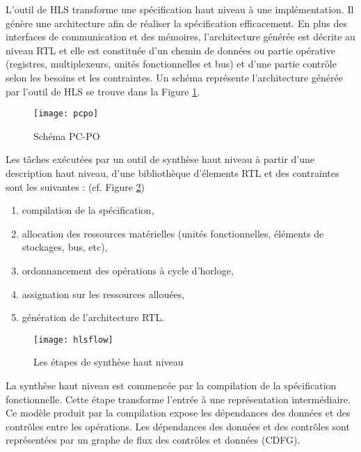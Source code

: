L'outil de HLS transforme une spécification haut niveau à une implémentation. Il génère une architecture
afin de réaliser la spécification efficacement. En plus des interfaces de communication et des mémoires,
l'architecture générée est décrite au niveau RTL et elle est constituée d'un chemin de données ou partie opérative (registres, multiplexeurs,
unités fonctionnelles et bus) et d'une partie contrôle selon les besoins et les contraintes. Un schéma représente
l'architecture générée par l'outil de HLS se trouve dans la Figure \ref{fig:pcpo}.

\begin{figure}[h]
	\centering
	\texttt{[image: pcpo]}
	\caption{Schéma PC-PO}
	\label{fig:pcpo}
	\vspace{-2mm}
\end{figure}

Les tâches exécutées par un outil de synthèse haut niveau à partir d'une description haut niveau,
d'une bibliothèque d'élements RTL et des contraintes sont les suivantes :
(cf. Figure \ref{fig:hlsflow})

\begin{enumerate}
	\item
	
	compilation de la spécification,
	\item
	
	allocation des ressources matérielles (unités fonctionnelles, éléments de stockages, bus, etc),
	\item
	
	ordonnancement des opérations à cycle d'horloge,
	\item
	
	assignation sur les ressources allouées,
	 \item
	
	génération de l'architecture RTL.
\end{enumerate}

\begin{figure}[h]
	\centering
	\texttt{[image: hlsflow]}
	\caption{Les étapes de synthèse haut niveau\cite{Coussy2009}}
	\label{fig:hlsflow}
	\vspace{-2mm}
\end{figure}

La synthèse haut niveau est commencée par la compilation de la spécification fonctionnelle.
Cette étape transforme l'entrée à une représentation intermédiaire. Ce modèle produit par la compilation
expose les dépendances des données et des contrôles entre les opérations. Les dépendances des données et des contrôles sont représentées
par un graphe de flux des contrôles et données (CDFG).

